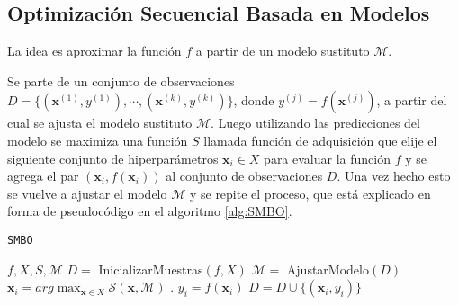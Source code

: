 \subsection{Optimización Secuencial Basada en Modelos}

La idea es aproximar la función $f$ a partir de un modelo sustituto $\mathcal{M}$.

Se parte de un conjunto de observaciones $D = \{(\textbf{x}^{(1)},y^{(1)}), \cdots, (\textbf{x}^{(k)},y^{(k)}) \}$, donde $y^{(j)} = f(\textbf{x}^{(j)})$, a partir del cual se ajusta el modelo sustituto $\mathcal{M}$. Luego utilizando las predicciones del modelo se maximiza una función $S$ llamada función de adquisición que elije el siguiente conjunto de hiperparámetros $\textbf{x}_i \in X$ para evaluar la función $f$ y se agrega el par $(\textbf{x}_i, f(\textbf{x}_i))$ al conjunto de observaciones $D$. Una vez hecho esto se vuelve a ajustar el modelo $\mathcal{M}$ y se repite el proceso, que está explicado en forma de pseudocódigo en el algoritmo \ref{alg:SMBO}.




\begin{algorithm}
\caption{\texttt{SMBO}}
\label{alg:SMBO}
\begin{algorithmic}[1]
\Require $f, X, S,\mathcal{M}$
\State $D =$ InicializarMuestras$(f, X)$
\vspace{1mm}
	\State $\mathcal{M} =$ AjustarModelo$(D)$
	\State $\textbf{x}_{i} = arg \max_{\textbf{x}\in X} \mathcal{S}(\textbf{x}, \mathcal{M})$ .
	\State $y_i = f(\textbf{x}_i)$	
	\State $D = D \cup \{(\textbf{x}_i, y_i)\}$
\EndFor
\vspace{3mm}

\end{algorithmic}
\end{algorithm}

